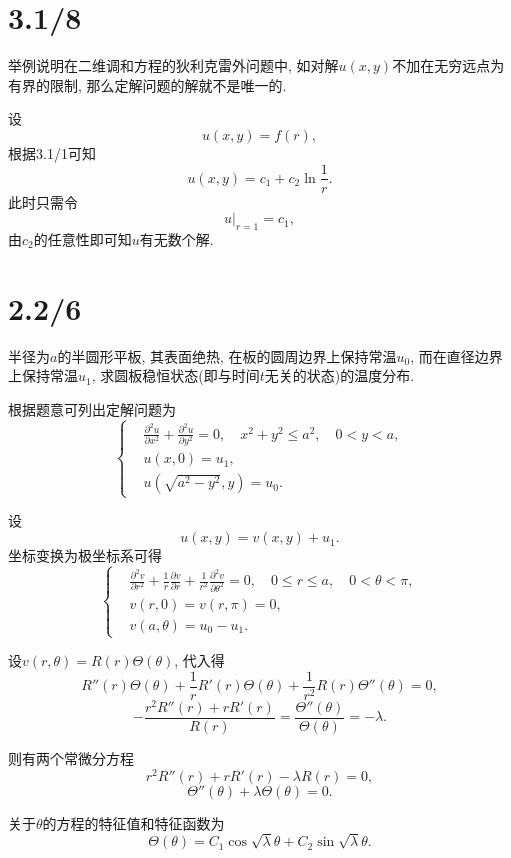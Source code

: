 \documentclass[11pt,a4paper]{article}
\begin{document}
\section{3.1/8}
\begin{problem}
举例说明在二维调和方程的狄利克雷外问题中, 如对解$u(x,y)$不加在无穷远点为有界的限制, 那么定解问题的解就不是唯一的.
\end{problem}
设$$u(x,y)=f(r),$$
根据3.1/1可知
$$u(x,y)=c_1+c_2\ln\frac{1}{r}.$$
此时只需令$$u|_{r=1}=c_1,$$
由$c_2$的任意性即可知$u$有无数个解.

\section{2.2/6}
\begin{problem}
半径为$a$的半圆形平板, 其表面绝热, 在板的圆周边界上保持常温$u_0$, 而在直径边界上保持常温$u_1$, 求圆板稳恒状态(即与时间$t$无关的状态)的温度分布.
\end{problem}
根据题意可列出定解问题为
$$\left\{\begin{aligned}
     & \frac{\partial^2u}{\partial x^2}
    +\frac{\partial^2u}{\partial y^2}=0,
    \quad x^2+y^2\leqslant a^2,
    \quad 0<y<a,                        \\
     & u(x,0)=u_1,                      \\
     & u(\sqrt{a^2-y^2},y)=u_0.
  \end{aligned}\right.$$

设
$$u(x,y)=v(x,y)+u_1.$$
坐标变换为极坐标系可得
$$\left\{\begin{aligned}
     & \frac{\partial^2v}{\partial r^2}
    +\frac{1}{r}\frac{\partial v}{\partial r}
    +\frac{1}{r^2}\frac{\partial^2v}{\partial \theta^2}=0,
    \quad 0\leqslant r\leqslant a,
    \quad 0<\theta<\pi ,                \\
     & v(r,0)=v(r,\pi)=0,               \\
     & v(a,\theta)=u_0-u_1.
  \end{aligned}\right.$$

设$v(r,\theta)=R(r)\Theta(\theta)$, 代入得
$$R''(r)\Theta(\theta)+\frac{1}{r}R'(r)\Theta(\theta)+\frac{1}{r^2}R(r)\Theta''(\theta)=0,$$
$$-\frac{r^2R''(r)+rR'(r)}{R(r)}=\frac{\Theta''(\theta)}{\Theta(\theta)}=-\lambda.$$

则有两个常微分方程
$$r^2R''(r)+rR'(r)-\lambda R(r)=0,$$
$$\Theta''(\theta)+\lambda \Theta(\theta)=0.$$

关于$\theta$的方程的特征值和特征函数为
$$\Theta(\theta)=C_1\cos\sqrt{\lambda}\theta+C_2\sin\sqrt{\lambda}\theta.$$
\end{document}
